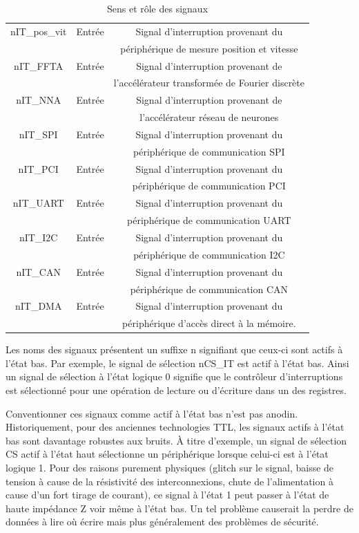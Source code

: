 \begin{table}[H]
\begin{tabular}{|c|c|c|}
		\hline
		nIT\_pos\_vit & Entrée & Signal d'interruption provenant du\\
		& & périphérique de mesure position et vitesse\\
		\hline
		nIT\_FFTA & Entrée & Signal d'interruption provenant de \\
		& & l'accélérateur transformée de Fourier discrète\\
		\hline
		nIT\_NNA & Entrée & Signal d'interruption provenant de \\
		& & l'accélérateur réseau de neurones\\
		\hline
		nIT\_SPI & Entrée & Signal d'interruption provenant du \\
		& & périphérique de communication SPI\\
		\hline
		nIT\_PCI & Entrée & Signal d'interruption provenant du \\
		& & périphérique de communication PCI\\
		\hline
		nIT\_UART & Entrée & Signal d'interruption provenant du \\
		& & périphérique de communication UART\\
		\hline
		nIT\_I2C & Entrée & Signal d'interruption provenant du \\
		& & périphérique de communication I2C\\
		\hline
		nIT\_CAN & Entrée & Signal d'interruption provenant du \\
		& & périphérique de communication CAN\\
		\hline
		nIT\_DMA & Entrée & Signal d'interruption provenant du \\
		& & périphérique d'accès direct à la mémoire.\\
		\hline
	\end{tabular}
	\caption{Sens et rôle des signaux}
	\label{tab:sens_role_signaux}
\end{table}
	
Les noms des signaux présentent un suffixe n signifiant que ceux-ci sont actifs à l'état bas.
Par exemple, le signal de sélection nCS\_IT est actif à l'état bas.
Ainsi un signal de sélection à l'état logique 0 signifie que le contrôleur d'interruptions est sélectionné pour une opération de lecture ou d'écriture dans un des registres.


Conventionner ces signaux comme actif à l'état bas n'est pas anodin.
Historiquement, pour des anciennes technologies \gls{TTL}, les signaux actifs à l'état bas sont davantage robustes aux bruits.  
À titre d'exemple, un signal de sélection CS actif à l'état haut sélectionne un périphérique lorsque celui-ci est à l'état logique 1.
Pour des raisons purement physiques (glitch sur le signal, baisse de tension à cause de la résistivité des interconnexions, chute de l'alimentation à cause d'un fort tirage de courant), ce signal à l'état 1 peut passer à l'état de haute impédance Z voir même à l'état bas.
Un tel problème causerait la perdre de données à lire où écrire mais plus généralement des problèmes de sécurité. 


